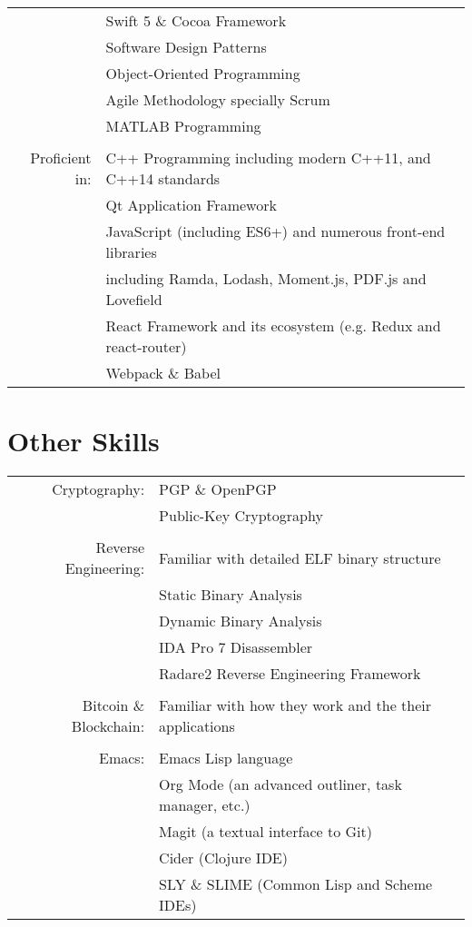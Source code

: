 \documentclass[a4paper,10pt]{article}
\begin{document}
\begin{tabular}{rl}
				& Swift 5 \& Cocoa Framework\\
				& Software Design Patterns\\
				& Object-Oriented Programming\\
				& Agile Methodology specially Scrum\\
				& MATLAB Programming\\
				\\
Proficient in: & C++ Programming including modern C++11, and C++14 standards\\
				& Qt Application Framework\\
				& JavaScript (including ES6+) and numerous front-end libraries\\
				& \hspace{1cm} including Ramda, Lodash, Moment.js, PDF.js and Lovefield\\
				& React Framework and its ecosystem (e.g. Redux and react-router)\\
				& Webpack \& Babel

\end{tabular}

\section{Other Skills}
\begin{tabular}{rl}
Cryptography:
	& PGP \& OpenPGP\\
	& Public-Key Cryptography\\
	\\
Reverse Engineering:
	& Familiar with detailed ELF binary structure\\
	& Static Binary Analysis\\
	& Dynamic Binary Analysis\\
	& IDA Pro 7 Disassembler\\
	& Radare2 Reverse Engineering Framework\\
	\\
Bitcoin \& Blockchain:
	& Familiar with how they work and the their applications\\
	\\
Emacs:
	& Emacs Lisp language\\
	& Org Mode (an advanced outliner, task manager, etc.)\\
	& Magit (a textual interface to Git)\\
	& Cider (Clojure IDE)\\
	& SLY \& SLIME (Common Lisp and Scheme IDEs)\\
\end{tabular}
\end{document}
